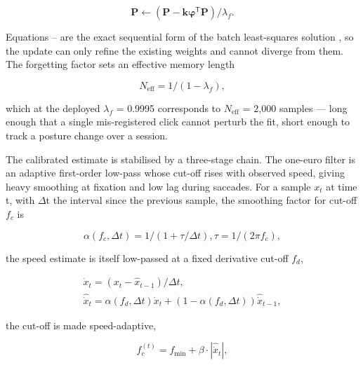 \begin{equation}
\label{eq:110}
\mathbf{P} \leftarrow ( \mathbf{P} - \mathbf{k} \boldsymbol{\varphi}^{\mathsf{T}} \mathbf{P} ) / \lambda _f .
\end{equation}

Equations -- are the exact sequential form of the batch least-squares solution , so the update can only refine the existing weights and cannot diverge from them. The forgetting factor sets an effective memory length

\begin{equation}
\label{eq:111}
N_{\mathrm{eff}} = 1 / ( 1 - \lambda _f ) ,
\end{equation}

which at the deployed $\lambda_{f}$ = 0.9995 corresponds to $N_{\mathrm{eff}}$ = 2,000 samples --- long enough that a single mis-registered click cannot perturb the fit, short enough to track a posture change over a session.

The calibrated estimate is stabilised by a three-stage chain. The one-euro filter  is an adaptive first-order low-pass whose cut-off rises with observed speed, giving heavy smoothing at fixation and low lag during saccades. For a sample $x_{t}$ at time t, with $\Delta$t the interval since the previous sample, the smoothing factor for cut-off $f_{c}$ is

\begin{equation}
\label{eq:112}
\alpha (f_c, \Delta t) = 1 / ( 1 + \tau /\Delta t ) , \tau = 1 / ( 2\pi f_c ),
\end{equation}

the speed estimate is itself low-passed at a fixed derivative cut-off $f_{d}$,

\begin{equation}
\label{eq:113}
\begin{aligned}
\dot{x}_t = ( x_t - \hat{x}_{t-1} ) / \Delta t, \\
\hat{\dot{x}}_t = \alpha (f_d, \Delta t) \dot{x}_t + ( 1 - \alpha (f_d, \Delta t) ) \hat{\dot{x}}_{t-1},
\end{aligned}
\end{equation}

the cut-off is made speed-adaptive,

\begin{equation}
\label{eq:114}
f_c^{(t)} = f_{\mathrm{min}} + \beta \cdot | \hat{\dot{x}}_t | ,
\end{equation}

